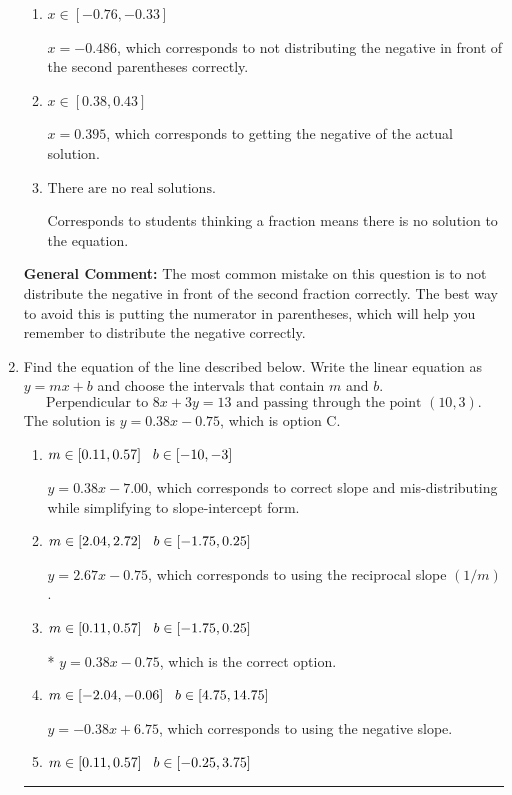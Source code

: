 \documentclass{extbook}[14pt]
\newcommand{\litem}[1]{\item #1

\rule{\textwidth}{0.4pt}}
\begin{document}
\begin{enumerate}
{\begin{enumerate}[label=\Alph*.]
* $x = 0.851$, which is the correct option.
\item \( x \in [-0.76, -0.33] \)

$x = -0.486$, which corresponds to not distributing the negative in front of the second parentheses correctly.
\item \( x \in [0.38, 0.43] \)

$x = 0.395$, which corresponds to getting the negative of the actual solution.
\item \( \text{There are no real solutions.} \)

Corresponds to students thinking a fraction means there is no solution to the equation.
\end{enumerate}

\textbf{General Comment:} The most common mistake on this question is to not distribute the negative in front of the second fraction correctly. The best way to avoid this is putting the numerator in parentheses, which will help you remember to distribute the negative correctly.
}
\litem{
Find the equation of the line described below. Write the linear equation as $ y=mx+b $ and choose the intervals that contain $m$ and $b$.
\[ \text{Perpendicular to } 8 x + 3 y = 13 \text{ and passing through the point } (10, 3). \]The solution is \( y = 0.38x - 0.75 \), which is option C.\begin{enumerate}[label=\Alph*.]
\item \( m \in [0.11, 0.57] \hspace*{3mm} b \in [-10, -3] \)

 $y = 0.38x - 7.00$, which corresponds to correct slope and mis-distributing while simplifying to slope-intercept form.
\item \( m \in [2.04, 2.72] \hspace*{3mm} b \in [-1.75, 0.25] \)

 $y = 2.67x - 0.75$, which corresponds to using the reciprocal slope $(1/m)$.
\item \( m \in [0.11, 0.57] \hspace*{3mm} b \in [-1.75, 0.25] \)

* $y = 0.38x - 0.75$, which is the correct option.
\item \( m \in [-2.04, -0.06] \hspace*{3mm} b \in [4.75, 14.75] \)

 $y = -0.38x + 6.75$, which corresponds to using the negative slope.
\item \( m \in [0.11, 0.57] \hspace*{3mm} b \in [-0.25, 3.75] \)


\end{enumerate}}
\end{enumerate}
\end{document}
